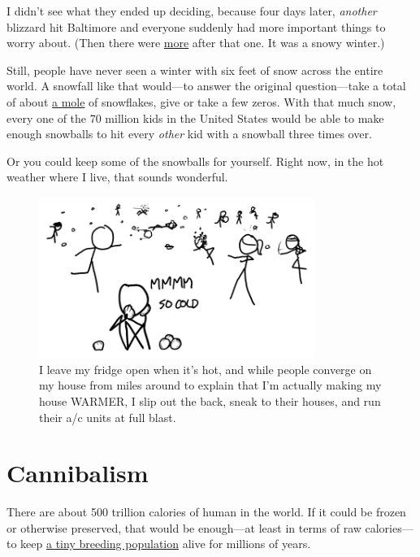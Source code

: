 {{I didn't see what they ended up deciding, because four days later, \emph{another} blizzard hit Baltimore and everyone suddenly had more important things to worry about. (Then there were \href{https://en.wikipedia.org/wiki/North\_American\_blizzards\_of\_2010}{more} after that one. It was a snowy winter.)}

{Still, people have never seen a winter with six feet of snow across the entire world. A snowfall like that would—to answer the original question—take a total of about \href{http://what-if.xkcd.com/4/}{a mole} of snowflakes, give or take a few zeros. With that much snow, every one of the 70 million kids in the United States would be able to make enough snowballs to hit every \emph{other} kid with a snowball three times over.}

{Or you could keep some of the snowballs for yourself. Right now, in the hot weather where I live, that sounds wonderful.}

\begin{figure}[!htbp]
\centering
\includegraphics[scale=0.5, max width=0.8\textwidth]{imgs/a/104/fight.png}
\caption{I leave my fridge open when it's hot, and while people converge on my house from miles around to explain that I'm actually making my house WARMER, I slip out the back, sneak to their houses, and run their a/c units at full blast.}
\end{figure}

{
\chapter{Cannibalism}
}

\hfill{}

{There are about 500 trillion calories of human in the world. If it could be frozen or otherwise preserved, that would be enough—at least in terms of raw calories—to keep \href{http://www.newscientist.com/article/dn1936-magic-number-for-space-pioneers-calculated.html\#.U8a1mo2gFSE}{a tiny breeding population} alive for millions of years.}

}
